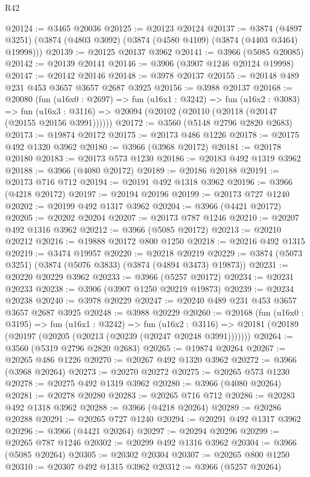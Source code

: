 \begin{lexlean}{R42}
\begin{coremodule}
@20124 := @3465 @20036
@20125 := @20123 @20124
@20137 := @3874
    (@4897 @3251)
    (@3874 (@4803 @3092) (@3874 (@4580 @4109) (@3874 (@4403 @3464) @19998)))
@20139 := @20125 @20137 @3962
@20141 := @3966 (@5085 @20085)
@20142 := @20139 @20141
@20146 := @3906 (@3907 @1246 @20124 @19998)
@20147 := @20142 @20146
@20148 := @3978 @20137
@20155 := @20148 @489 @231 @453 @3657 @3657 @2687 @3925
@20156 := @3988 @20137
@20168 := @20080
    (fun (u16x0 : @2697) =>
    fun (u16x1 : @3242) =>
    fun (u16x2 : @3083) =>
    fun (u16x3 : @3116) => @20094 (@20102 (@20110 (@20118 (@20147 (@20155 @20156 @3991))))))
@20172 := @3560 (@5148 @2796 @2820 @2683)
@20173 := @19874 @20172
@20175 := @20173 @486 @1226
@20178 := @20175 @492 @1320 @3962
@20180 := @3966 (@3968 @20172)
@20181 := @20178 @20180
@20183 := @20173 @573 @1230
@20186 := @20183 @492 @1319 @3962
@20188 := @3966 (@4080 @20172)
@20189 := @20186 @20188
@20191 := @20173 @716 @712
@20194 := @20191 @492 @1318 @3962
@20196 := @3966 (@4218 @20172)
@20197 := @20194 @20196
@20199 := @20173 @727 @1240
@20202 := @20199 @492 @1317 @3962
@20204 := @3966 (@4421 @20172)
@20205 := @20202 @20204
@20207 := @20173 @787 @1246
@20210 := @20207 @492 @1316 @3962
@20212 := @3966 (@5085 @20172)
@20213 := @20210 @20212
@20216 := @19888 @20172 @800 @1250
@20218 := @20216 @492 @1315
@20219 := @3474 @19957
@20220 := @20218 @20219
@20229 := @3874 (@5073 @3251) (@3874 (@5076 @3833) (@3874 (@4894 @3473) @19873))
@20231 := @20220 @20229 @3962
@20233 := @3966 (@5257 @20172)
@20234 := @20231 @20233
@20238 := @3906 (@3907 @1250 @20219 @19873)
@20239 := @20234 @20238
@20240 := @3978 @20229
@20247 := @20240 @489 @231 @453 @3657 @3657 @2687 @3925
@20248 := @3988 @20229
@20260 := @20168
    (fun (u16x0 : @3195) =>
    fun (u16x1 : @3242) =>
    fun (u16x2 : @3116) =>
    @20181 (@20189 (@20197 (@20205 (@20213 (@20239 (@20247 @20248 @3991)))))))
@20264 := @3560 (@5319 @2796 @2820 @2683)
@20265 := @19874 @20264
@20267 := @20265 @486 @1226
@20270 := @20267 @492 @1320 @3962
@20272 := @3966 (@3968 @20264)
@20273 := @20270 @20272
@20275 := @20265 @573 @1230
@20278 := @20275 @492 @1319 @3962
@20280 := @3966 (@4080 @20264)
@20281 := @20278 @20280
@20283 := @20265 @716 @712
@20286 := @20283 @492 @1318 @3962
@20288 := @3966 (@4218 @20264)
@20289 := @20286 @20288
@20291 := @20265 @727 @1240
@20294 := @20291 @492 @1317 @3962
@20296 := @3966 (@4421 @20264)
@20297 := @20294 @20296
@20299 := @20265 @787 @1246
@20302 := @20299 @492 @1316 @3962
@20304 := @3966 (@5085 @20264)
@20305 := @20302 @20304
@20307 := @20265 @800 @1250
@20310 := @20307 @492 @1315 @3962
@20312 := @3966 (@5257 @20264)

\end{coremodule}
\end{lexlean}

